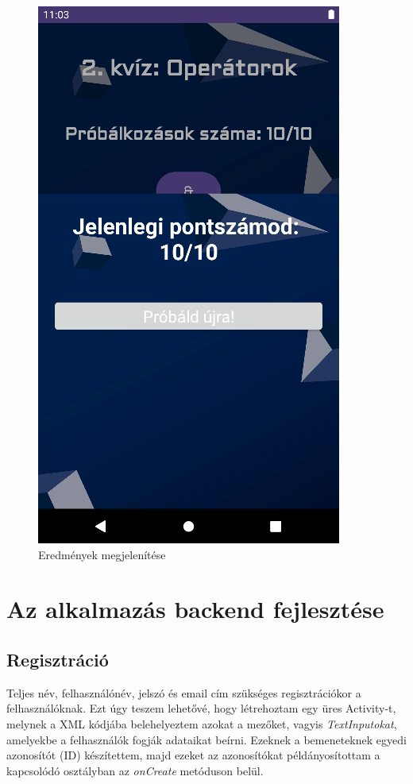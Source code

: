 \documentclass{thesis-ekf}
\begin{document}
\begin{figure}[tbh]
	\centering
	\includegraphics[width=0.7\linewidth]{operatoreredmeny}
	\caption{Eredmények megjelenítése}
	\label{operatoreredmeny}
\end{figure}

\chapter{Az alkalmazás backend fejlesztése}
\section{Regisztráció}
Teljes név, felhasználónév, jelszó és email cím szükséges regisztrációkor a felhasználóknak. Ezt úgy teszem lehetővé, hogy létrehoztam egy üres Activity-t, melynek a XML kódjába belehelyeztem azokat a mezőket, vagyis \textit{TextInputokat}, amelyekbe a felhasználók fogják adataikat beírni. Ezeknek a bemeneteknek egyedi azonosítót (ID) készítettem, majd ezeket az azonosítókat példányosítottam a kapcsolódó osztályban az \textit{onCreate} metóduson belül.
\end{document}
